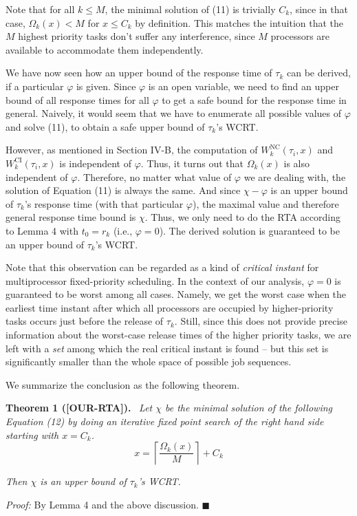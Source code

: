 Note that for all $k \leq M$, the minimal solution of (11) is trivially $C_k$, since in that case, $\Omega_k(x) < M$ for $x \leq C_k$ by definition. This matches the intuition that the $M$ highest priority tasks don't suffer any interference, since $M$ processors are available to accommodate them independently.

We have now seen how an upper bound of the response time of $\tau_k$ can be derived, if a particular $\varphi$ is given. Since $\varphi$ is an open variable, we need to find an upper bound of all response times for all $\varphi$ to get a safe bound for the response time in general. Naively, it would seem that we have to enumerate all possible values of $\varphi$ and solve (11), to obtain a safe upper bound of $\tau_k$'s WCRT.

However, as mentioned in Section IV-B, the computation of $W_k^{\mathrm{NC}}(\tau_i,x)$ and $W_k^{\mathrm{CI}}(\tau_i,x)$ is independent of $\varphi$. Thus, it turns out that $\Omega_k(x)$ is also independent of $\varphi$. Therefore, no matter what value of $\varphi$ we are dealing with, the solution of Equation (11) is always the same. And since $\chi-\varphi$ is an upper bound of $\tau_k$'s response time (with that particular $\varphi$), the maximal value and therefore general response time bound is $\chi$. Thus, we only need to do the RTA according to Lemma 4 with $t_0=r_k$ (i.e., $\varphi=0$). The derived solution is guaranteed to be an upper bound of $\tau_k$'s WCRT.

Note that this observation can be regarded as a kind of \textit{critical instant} for multiprocessor fixed-priority scheduling. In the context of our analysis, $\varphi=0$ is guaranteed to be worst among all cases. Namely, we get the worst case when the earliest time instant after which all processors are occupied by higher-priority tasks occurs just before the release of $\tau_k$. Still, since this does not provide precise information about the worst-case release times of the higher priority tasks, we are left with a \textit{set} among which the real critical instant is found -- but this set is significantly smaller than the whole space of possible job sequences.

We summarize the conclusion as the following theorem.

\textbf{Theorem 1 ([OUR-RTA]).} \ \textit{Let $\chi$ be the minimal solution of the following Equation (12) by doing an iterative fixed point search of the right hand side starting with $x=C_k$.}
\[
x=\left\lceil \frac{\Omega_k(x)}{M} \right\rceil + C_k
\tag{12}
\]

\textit{Then $\chi$ is an upper bound of $\tau_k$'s WCRT.}

\bigskip

\noindent
\textit{Proof:} By Lemma 4 and the above discussion. \hfill $\blacksquare$